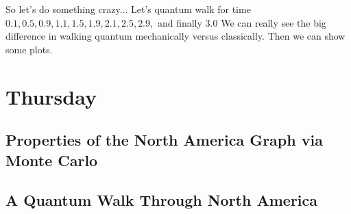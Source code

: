 \documentclass{article}
\theoremstyle{definition}
\theoremstyle{remark}
\begin{document}
So let's do something crazy... Let's quantum walk for time $0.1, 0.5, 0.9, 1.1, 1.5, 1.9, 2.1, 2.5, 2.9,$ and finally $3.0$ We can really see the big difference in walking quantum mechanically versus classically. Then we can show some plots.

\begin{tabular}

\end{tabular}
\section{Thursday}
\subsection{Properties of the North America Graph via Monte Carlo}
\subsection{A Quantum Walk Through North America}
\end{document}
